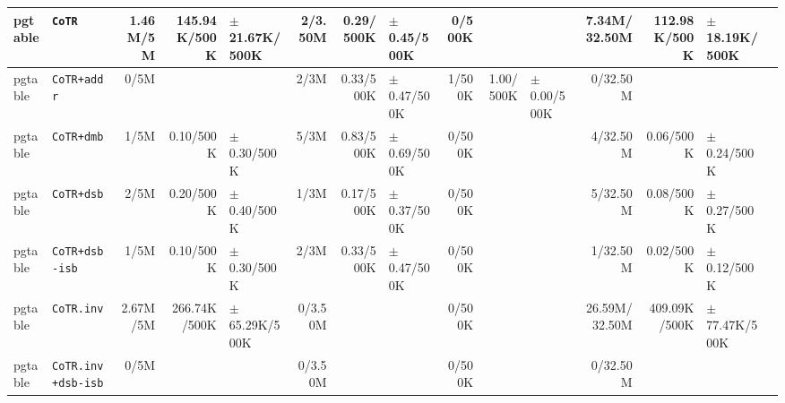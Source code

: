 \begin{tabular}{l l  | r r l | r r l | r r l | r r l l}
         pgtable &                                                \verb|CoTR| &       1.46M/5M &          145.94K/500K & $\pm$ 21.67K/500K &        2/3.50M &             0.29/500K & $\pm$ 0.45/500K &         0/500K &                       &                   &   7.34M/32.50M &          112.98K/500K & $\pm$ 18.19K/500K & \\ \hline 
         pgtable &                                           \verb|CoTR+addr| &           0/5M &                       &                   &           2/3M &             0.33/500K & $\pm$ 0.47/500K &         1/500K &             1.00/500K &   $\pm$ 0.00/500K &       0/32.50M &                       &                   & \\ \hline 
         pgtable &                                            \verb|CoTR+dmb| &           1/5M &             0.10/500K &   $\pm$ 0.30/500K &           5/3M &             0.83/500K & $\pm$ 0.69/500K &         0/500K &                       &                   &       4/32.50M &             0.06/500K &   $\pm$ 0.24/500K & \\ \hline 
         pgtable &                                            \verb|CoTR+dsb| &           2/5M &             0.20/500K &   $\pm$ 0.40/500K &           1/3M &             0.17/500K & $\pm$ 0.37/500K &         0/500K &                       &                   &       5/32.50M &             0.08/500K &   $\pm$ 0.27/500K & \\ \hline 
         pgtable &                                        \verb|CoTR+dsb-isb| &           1/5M &             0.10/500K &   $\pm$ 0.30/500K &           2/3M &             0.33/500K & $\pm$ 0.47/500K &         0/500K &                       &                   &       1/32.50M &             0.02/500K &   $\pm$ 0.12/500K & \\ \hline 
         pgtable &                                            \verb|CoTR.inv| &       2.67M/5M &          266.74K/500K & $\pm$ 65.29K/500K &        0/3.50M &                       &                 &         0/500K &                       &                   &  26.59M/32.50M &          409.09K/500K & $\pm$ 77.47K/500K & \\ \hline 
         pgtable &                                    \verb|CoTR.inv+dsb-isb| &           0/5M &                       &                   &        0/3.50M &                       &                 &         0/500K &                       &                   &       0/32.50M &                       &                   & \\ \hline 

\end{tabular}
